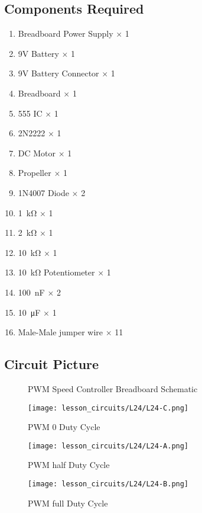 \subsection{Components Required}
\begin{enumerate}
    \item Breadboard Power Supply $\times$ 1
    \item 9V Battery $\times$ 1
    \item 9V Battery Connector $\times$ 1
    \item Breadboard $\times$ 1
    \item 555 IC $\times$ 1
    \item 2N2222 $\times$ 1
    \item DC Motor $\times$ 1
    \item Propeller $\times$ 1
    \item 1N4007 Diode $\times$ 2
    \item \SI{1}{\kilo\ohm} $\times$ 1
    \item \SI{2}{\kilo\ohm} $\times$ 1
    \item \SI{10}{\kilo\ohm} $\times$ 1
    \item \SI{10}{\kilo\ohm} Potentiometer $\times$ 1
    \item \SI{100}{\nano\farad} $\times$ 2
    \item \SI{10}{\micro\farad} $\times$ 1
    \item Male-Male jumper wire $\times$ 11
\end{enumerate}
\subsection{Circuit Picture}
\begin{figure}[!htp]
    \centering
    \caption{PWM Speed Controller Breadboard Schematic}
    \label{fig:555_pwm_sch}
\end{figure}
\begin{figure}[!htp]
    \centering
    \texttt{[image: lesson\_circuits/L24/L24-C.png]}
    \caption{PWM 0 Duty Cycle}
    \label{fig:555_pwm_obb}
\end{figure}
\begin{figure}[!htp]
    \centering
    \texttt{[image: lesson\_circuits/L24/L24-A.png]}
    \caption{PWM half Duty Cycle}
    \label{fig:555_pwm_obb1}
\end{figure}
\begin{figure}[!htp]
    \centering
    \texttt{[image: lesson\_circuits/L24/L24-B.png]}
    \caption{PWM full Duty Cycle}
    \label{fig:555_pwm_obb2}
\end{figure}
